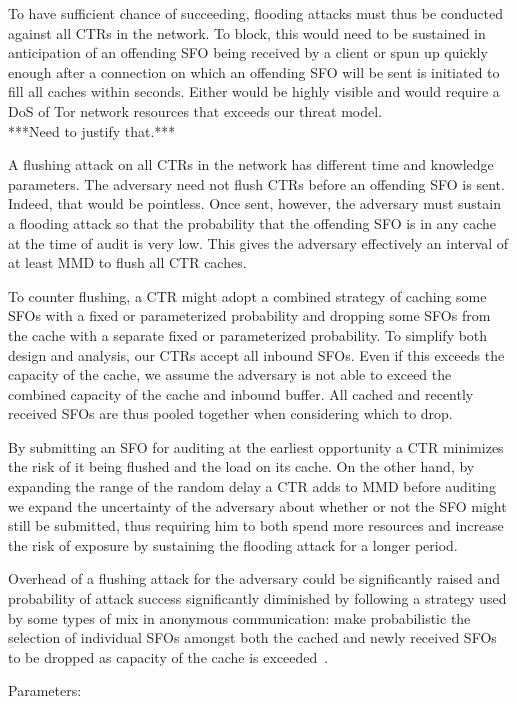 To have sufficient chance of succeeding, flooding attacks must thus be
conducted against all CTRs in the network. To block, this would need to
be sustained in anticipation of an offending SFO being received by
a client or spun up quickly enough after a connection on which an
offending SFO will be sent is initiated to fill all caches within
seconds. Either would be highly visible and would require a
DoS of Tor network resources that exceeds our threat model.\\
***Need to justify that.***

A flushing attack on all CTRs in the network has different time and
knowledge parameters. The adversary need not flush CTRs before an
offending SFO is sent. Indeed, that would be pointless. Once sent,
however, the adversary must sustain a flooding attack so that the
probability that the offending SFO is in any cache at the time of
audit is very low. This gives the adversary effectively an interval
of at least MMD to flush all CTR caches.

To counter flushing, a CTR might adopt a combined strategy of caching
some SFOs with a fixed or parameterized probability and dropping some
SFOs from the cache with a separate fixed or parameterized
probability. To simplify both design and analysis, our CTRs accept all
inbound SFOs. Even if this exceeds the capacity of the cache, we
assume the adversary is not able to exceed the combined capacity of
the cache and inbound buffer. All cached and recently received SFOs
are thus pooled together when considering which to drop. 

By submitting an SFO for auditing at the earliest opportunity a CTR
minimizes the risk of it being flushed and the load on its cache. On
the other hand, by expanding the range of the random delay a CTR adds
to MMD before auditing we expand the uncertainty of the adversary
about whether or not the SFO might still be submitted, thus requiring
him to both spend more resources and increase the risk of exposure by
sustaining the flooding attack for a longer period.

Overhead of a flushing attack for the adversary could be significantly
raised and probability of attack success significantly diminished by
following a strategy used by some types of mix in anonymous
communication: make probabilistic the selection of individual SFOs
amongst both the cached and newly received SFOs to be dropped as
capacity of the cache is exceeded~\cite{trickle02}.


Parameters:


